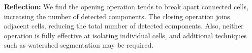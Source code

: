 \documentclass[12pt]{article}
\begin{document}
\textbf{Reflection: }We find the opening operation tends to break apart connected cells, increasing the number of detected components. The closing operation joins adjacent cells, reducing the total number of detected components. Also, neither operation is fully effective at isolating individual cells, and additional techniques such as watershed segmentation may be required.

\subsection{} %

\subsection{} %
\end{document}
